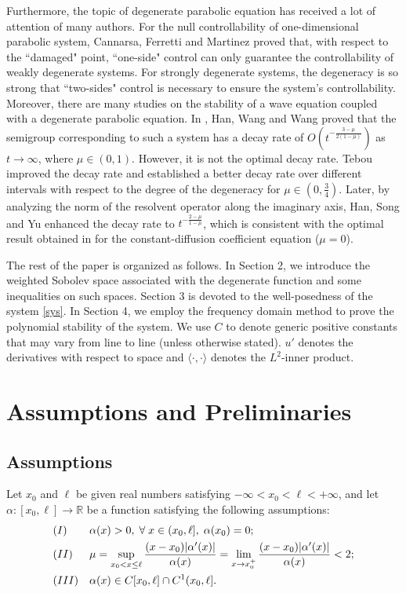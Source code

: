 \documentclass[twoside]{article}
\theoremstyle{noparens}
\theoremstyle{definition}
\numberwithin{equation}{section}
\numberwithin{figure}{section}
\begin{document}
Furthermore, the topic of degenerate parabolic equation has received a lot of attention of many authors.
For the null controllability of one-dimensional parabolic system, Cannarsa, Ferretti and Martinez \cite{para} proved that, with respect to the ``damaged" point, ``one-side" control can only guarantee the controllability of weakly degenerate systems. For strongly degenerate systems, the degeneracy is so strong that ``two-sides" control is necessary to ensure the system's controllability. Moreover, there are many studies on the stability of a wave equation coupled with a degenerate parabolic equation. In \cite{Han 1}, Han, Wang and Wang proved that the semigroup corresponding to such a system has a decay rate of $O(t^{-\frac{3 -\mu}{2(1-\mu)}})$ as $t\to \infty$, where $\mu\in(0, 1)$. However, it is not the optimal decay rate. Tebou \cite{Tebou} improved the decay rate and established a better decay rate over different intervals with respect to the degree of the degeneracy for $\mu\in(0, \frac{3}{4})$. Later, by analyzing the norm of the resolvent operator along the imaginary axis, Han, Song and Yu \cite{Han 2} enhanced the decay rate to $t^{-\frac{2-\mu}{1-\mu}}$, which is consistent with the optimal result obtained in \cite{zuazua} for the constant-diffusion coefficient equation ($\mu=0$).

The rest of the paper is organized as follows. In Section 2, we introduce the weighted Sobolev space associated with the degenerate function and some inequalities on such spaces. Section 3 is devoted to the well-posedness of the system \eqref{sys}. In Section 4, we employ the frequency domain method to prove the polynomial stability of the system.  We use $C$ to denote generic positive constants that may vary from line to line (unless otherwise stated). $u'$ denotes the derivatives with respect to space and $\langle \cdot,\cdot\rangle$ denotes the $L^2$-inner product.
\section{Assumptions and Preliminaries}
\subsection{Assumptions}
Let $x_0$ and $\ell$ be given real numbers satisfying $-\infty<x_0<\ell<+\infty$, and let $\alpha:[x_0,\ell]\rightarrow\mathbb{R}$ be a function satisfying the following assumptions:
\begin{subequations}
	\begin{align}
		&(I)&&\alpha(x)>0,\;\forall\; x \in(x_0,\ell],\; \alpha(x_0) = 0;\\
		&(II)&&\mu = \sup_{x_0<x\leq \ell}{(x- x_0 )|\alpha'(x)|\over \alpha(x)} = \lim_{x\rightarrow x_0^+} {(x - x_0)|\alpha'(x)|\over \alpha(x)}<2;\label{mu-r}\\
		&(III)&&\alpha(x)\in C[x_0,\ell] \cap C^1(x_0,\ell].
	\end{align}
\end{subequations}
\end{document}
